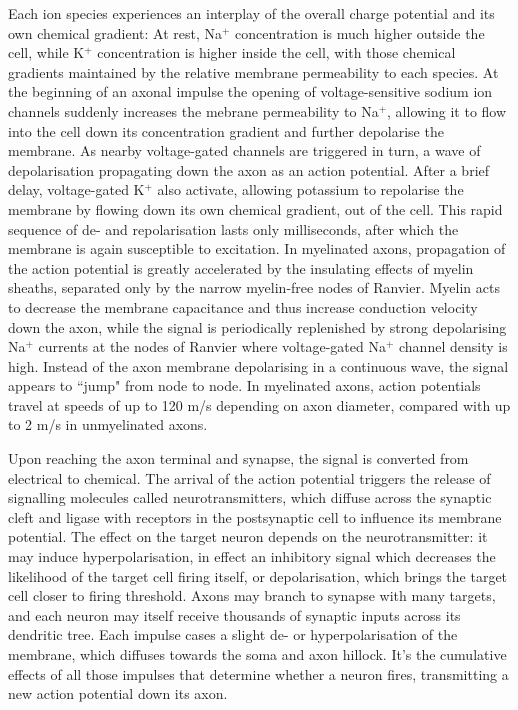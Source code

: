 Each ion species experiences an interplay of the overall charge potential and its own chemical gradient:
At rest, Na$^+$ concentration is much higher outside the cell, while K$^+$ concentration is higher inside the cell, with those chemical gradients maintained by the relative membrane permeability to each species.
At the beginning of an axonal impulse the opening of voltage-sensitive sodium ion channels suddenly increases the mebrane permeability to Na$^+$, allowing it to flow into the cell down its concentration gradient and further depolarise the membrane.
As nearby voltage-gated channels are triggered in turn, a wave of depolarisation propagating down the axon as an action potential.
After a brief delay, voltage-gated K$^+$ also activate, allowing potassium to repolarise the membrane by flowing down its own chemical gradient, out of the cell.
This rapid sequence of de- and repolarisation lasts only milliseconds, after which the membrane is again susceptible to excitation.
In myelinated axons, propagation of the action potential is greatly accelerated by the insulating effects of myelin sheaths, separated only by the narrow myelin-free nodes of Ranvier.
Myelin acts to decrease the membrane capacitance and thus increase conduction velocity down the axon, while the signal is periodically replenished by strong depolarising Na$^+$ currents at the nodes of Ranvier where voltage-gated Na$^+$ channel density is high.
Instead of the axon membrane depolarising in a continuous wave, the signal appears to ``jump" from node to node.
In myelinated axons, action potentials travel at speeds of up to 120 m/s depending on axon diameter, compared with up to 2 m/s in unmyelinated axons.

Upon reaching the axon terminal and synapse, the signal is converted from electrical to chemical.
The arrival of the action potential triggers the release of signalling molecules called neurotransmitters, which diffuse across the synaptic cleft and ligase with receptors in the postsynaptic cell to influence its membrane potential.
The effect on the target neuron depends on the neurotransmitter: it may induce hyperpolarisation, in effect an inhibitory signal which decreases the likelihood of the target cell firing itself, or depolarisation, which brings the target cell closer to firing threshold.
Axons may branch to synapse with many targets, and each neuron may itself receive thousands of synaptic inputs across its dendritic tree.
Each impulse cases a slight de- or hyperpolarisation of the membrane, which diffuses towards the soma and axon hillock.
It's the cumulative effects of all those impulses that determine whether a neuron fires, transmitting a new action potential down its axon.

